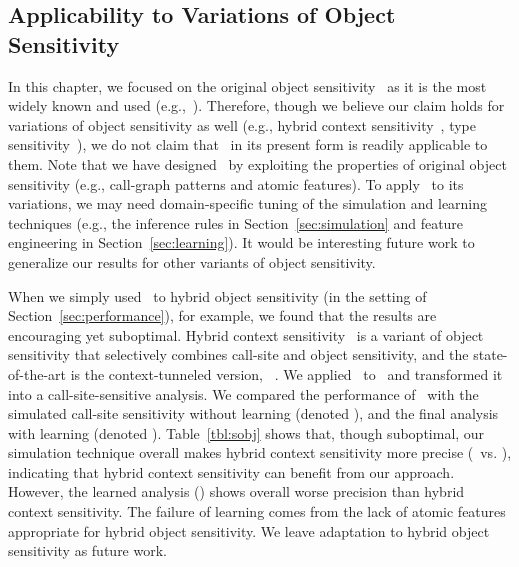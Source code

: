 



\subsection{Applicability to Variations of Object Sensitivity}

In this chapter, we focused on the original object sensitivity~\cite{Milanova2002} as it is the most widely known and used (e.g.,~\cite{Li2018b,Li2018a,TanLX16,Smaragdakis2014,GordonKPGNR_NDSS15,Feng2014,Lu:2019:PYF,Li2018a}). 
Therefore, though we believe our claim holds for variations of object sensitivity as well (e.g., hybrid context sensitivity~\cite{KastrinisS13a}, type sensitivity~\cite{Smaragdakis2011}), we do not claim that \ourtechnique~in its present form is readily applicable to them. 
Note that we have designed \ourtechnique~by exploiting the properties of original object sensitivity (e.g., call-graph patterns and atomic features). To apply \ourtechnique~to its variations, we may need domain-specific tuning of the simulation and learning techniques (e.g., the inference rules in Section~\ref{sec:simulation} and feature engineering in Section~\ref{sec:learning}). 
It would be interesting future work to generalize our results for other variants of object sensitivity.


When we simply used \ourtechnique~to hybrid object sensitivity (in the setting of Section~\ref{sec:performance}), for example, we found that the results are encouraging yet suboptimal. 
Hybrid context sensitivity~\cite{KastrinisS13a} is a variant of object sensitivity that selectively combines call-site and object sensitivity, and the state-of-the-art is the context-tunneled version,  \onesobjHT~\cite{JeJeOh18}. 
We applied \ourtechnique~to \onesobjHT~and transformed it into a call-site-sensitive analysis. 
We compared the performance of \onesobjHT~with the simulated call-site sensitivity without learning (denoted \simonecallH), and the final analysis with learning (denoted \sobjSimLearn). 
Table~\ref{tbl:sobj} shows that, though suboptimal, our simulation technique overall makes hybrid context sensitivity more precise (\simonecallH~vs. \onesobjHT), indicating that hybrid context sensitivity can benefit from our approach. However, the learned analysis (\sobjSimLearn) shows overall worse precision than hybrid context sensitivity.  
The failure of learning comes from the lack of atomic features appropriate for hybrid object sensitivity. We leave adaptation to hybrid object sensitivity as future work. 



